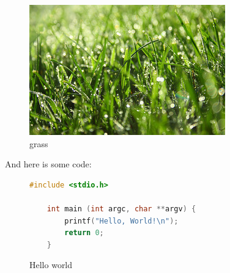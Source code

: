 \begin{figure}[h!]
\centering
\includegraphics[scale=0.5]{figures/grass}
\caption{grass}
\label{fig:grass}
\end{figure}


And here is some code:
\begin{figure}[H]
\begin{singlespace}
\begin{lstlisting}[language=c]
    #include <stdio.h> 

    int main (int argc, char **argv) {
	    printf("Hello, World!\n");
        return 0;
    }
\end{lstlisting}
\end{singlespace}
\caption{Hello world}
\label{fig:hellocode}
\end{figure}


